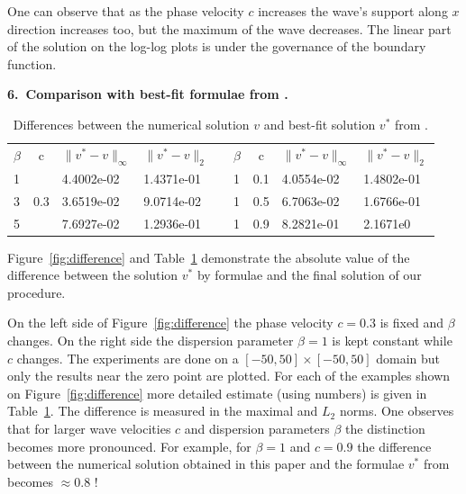 \documentclass[leqno,11pt]{book}
\newcommand{\sect}[1]{\bigskip \par {\large\bf #1}}
\begin{document}
One can observe that as the phase velocity $c$ increases the wave's support  along $x$ direction increases too, but the maximum of the wave decreases. The linear part of the solution on the log-log plots is under the governance of the boundary function.

\bigskip


\sect{6.~Comparison with best-fit formulae from \cite{Ch2011}.}

\begin{center}
\begin{table}[ht]
\centering
\resizebox{12cm}{!} {
		\begin{tabular}{|l|c|l l| c|l|c|l l|}
			\cline{1-4}\cline{6-9}
$\beta$&c&$\|v^*-v \|_{\infty }$&$\|v^*-v \|_{2 }$& &$\beta$& c&$\|v^*-v \|_{\infty }$&$\|v^*-v \|_{2 }$\\
			\cline{1-4}\cline{6-9}
1&     &4.4002e-02 & 1.4371e-01 & &    1& 0.1& 4.0554e-02  &1.4802e-01\\
3& 0.3 &3.6519e-02 & 9.0714e-02& &    1& 0.5& 6.7063e-02  &1.6766e-01\\
5&     &7.6927e-02 & 1.2936e-01 & &    1& 0.9&  8.2821e-01 &2.1671e0\\
			\cline{1-4}\cline{6-9}
\end{tabular}
}
		\caption{Differences between the numerical solution $v$ and best-fit solution $v^*$ from \cite{Ch2011}.}
\label{tab:first-der-t}
\end{table}
\end{center}

Figure~\ref{fig:difference} and Table~\ref{tab:first-der-t} demonstrate the  absolute value of the difference between  the solution $v^*$ by formulae \cite{Ch2011}  and the final solution of our procedure.

On the left side of Figure~\ref{fig:difference} the phase velocity $c = 0.3$ is fixed  and $\beta$ changes. On the right side  the dispersion parameter $\beta=1$ is kept constant while $c$ changes. The experiments are done on a $[-50,  50] \times [-50,50]$  domain  but only the results near the zero point are plotted. For each of the examples shown on Figure~\ref{fig:difference} more detailed estimate (using numbers) is given in Table~\ref{tab:first-der-t}. The difference is measured in the maximal and $L_2$ norms. One observes that for larger wave velocities $c$ and dispersion parameters $\beta$ the distinction becomes more pronounced. For example, for $\beta =1$ and $c=0.9$ the difference between the numerical solution obtained in this paper and the formulae  $v^*$ from \cite{Ch2011} becomes $\approx 0.8$ !
\end{document}
